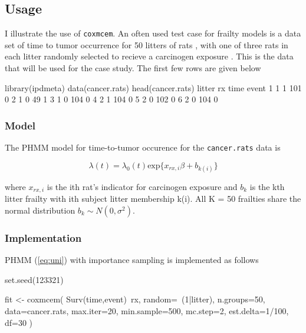 \subsection{Usage}

I illustrate the use of \texttt{coxmcem}. An often used test case for
frailty models is a data set of time to tumor occurrence for 50 litters of
rats \cite[chapter 9]{Therneau2000a}, with one of three rats in each litter randomly selected to recieve
a
carcinogen exposure \citep{Mantel1977a}. This is the data that will be
used for the case study. The first few rows are given below

\begin{Schunk}
\begin{Sinput}
library(ipdmeta)
data(cancer.rats)
head(cancer.rats)
  litter rx time event
1      1  1  101      0
2      1  0   49      1
3      1  0  104      0
4      2  1  104      0
5      2  0  102      0
6      2  0  104      0
\end{Sinput}
\end{Schunk}

\subsubsection{Model}

The PHMM model for time-to-tumor occurence for the
\texttt{cancer.rats} data is

\begin{equation}
\label{eq:uni}
\lambda(t) = \lambda_0(t) \mbox{exp}\lbrace x_{rx,i} \beta + b_{k(i)} \rbrace
\end{equation}

\noindent where $x_{rx,i}$ is the ith rat's indicator for carcinogen
exposure and $b_k$ is the kth litter frailty with ith subject litter
membership k(i). All K = 50 frailties share the normal distribution $b_k \sim N(0,\sigma^2)$. 

\subsubsection{Implementation}

PHMM (\ref{eq:uni}) with importance sampling is implemented as follows

\begin{Schunk}
\begin{Sinput}
set.seed(123321)

fit <- coxmcem(
    Surv(time,event)~rx,
    random=~(1|litter),
    n.groups=50,
    data=cancer.rats,
    max.iter=20,
    min.sample=500,
    mc.step=2,
    est.delta=1/100,
    df=30
)
\end{Sinput}
\end{Schunk}

